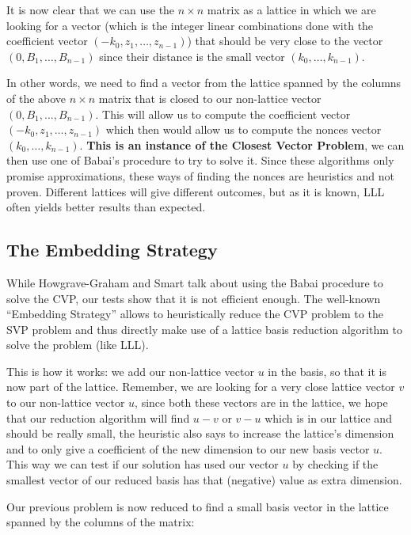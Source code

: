 \documentclass[a4paper,11pt]{article}
\begin{document}
It is now clear that we can use the $n \times n$ matrix as a lattice in which we are looking for a vector (which is the integer linear combinations done with the coefficient vector $(-k_0, z_1, \hdots, z_{n-1})$) that should be very close to the vector $(0, B_1 , \hdots, B_{n-1})$ since their distance is the small vector $(k_0, \hdots, k_{n-1})$.

In other words, we need to find a vector from the lattice spanned by the columns of the above $n \times n$ matrix that is closed to our non-lattice vector $(0, B_1 , \hdots, B_{n-1})$. This will allow us to compute the coefficient vector $(-k_0, z_1, \hdots, z_{n-1})$ which then would allow us to compute the nonces vector $(k_0, \hdots, k_{n-1})$. \textbf{This is an instance of the Closest Vector Problem}, we can then use one of Babai's procedure to try to solve it. Since these algorithms only promise approximations, these ways of finding the nonces are heuristics and not proven. Different lattices will give different outcomes, but as it is known, LLL often yields better results than expected.

\subsection{The Embedding Strategy}

While Howgrave-Graham and Smart talk about using the Babai procedure to solve the CVP, our tests show that it is not efficient enough. The well-known ``Embedding Strategy'' allows to heuristically reduce the CVP problem to the SVP problem and thus directly make use of a lattice basis reduction algorithm to solve the problem (like LLL).

This is how it works: we add our non-lattice vector $u$ in the basis, so that it is now part of the lattice. Remember, we are looking for a very close lattice vector $v$ to our non-lattice vector $u$, since both these vectors are in the lattice, we hope that our reduction algorithm will find $u - v$ or $v - u$ which is in our lattice and should be really small, the heuristic also says to increase the lattice's dimension and to only give a coefficient of the new dimension to our new basis vector $u$. This way we can test if our solution has used our vector $u$ by checking if the smallest vector of our reduced basis has that (negative) value as extra dimension.

Our previous problem is now reduced to find a small basis vector in the lattice spanned by the columns of the matrix:
\end{document}
